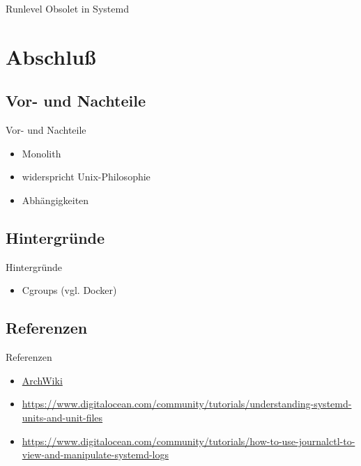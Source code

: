 \begin{frame}{Runlevel}
 Obsolet in Systemd
\end{frame}

\section{Abschluß}
\subsection{Vor- und Nachteile}

\begin{frame}{Vor- und Nachteile}
\begin{itemize}
\item Monolith
\item widerspricht Unix-Philosophie
\item Abhängigkeiten
\end{itemize}
\end{frame}

\subsection{Hintergründe}

\begin{frame}{Hintergründe}
  \begin{itemize}
    \item Cgroups (vgl. Docker)
  \end{itemize}
\end{frame}

\subsection{Referenzen}

\begin{frame}{Referenzen}
\begin{itemize}	
	\item \href{https://wiki.archlinux.org/index.php/systemd}{ArchWiki}

	\item \href{https://www.digitalocean.com/community/tutorials/understanding-systemd-units-and-unit-files}{https://www.digitalocean.com/community/tutorials/understanding-systemd-units-and-unit-files}

	\item \href{https://www.digitalocean.com/community/tutorials/how-to-use-journalctl-to-view-and-manipulate-systemd-logs}{https://www.digitalocean.com/community/tutorials/how-to-use-journalctl-to-view-and-manipulate-systemd-logs}
\end{itemize}
\end{frame}



